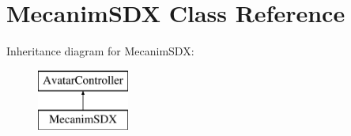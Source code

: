 \hypertarget{class_mecanim_s_d_x}{}\section{Mecanim\+S\+DX Class Reference}
\label{class_mecanim_s_d_x}
Inheritance diagram for Mecanim\+S\+DX\+:\begin{figure}[H]
\begin{center}
\leavevmode
\includegraphics[height=2.000000cm]{class_mecanim_s_d_x}
\end{center}
\end{figure}
